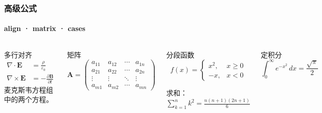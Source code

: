 \begin{frame}
\frametitle{高级公式}
\framesubtitle{align · matrix · cases}

\begin{columns}[T]
\begin{block}{多行对齐}
\begin{align}
  \nabla \cdot \mathbf{E} &= \frac{\rho}{\varepsilon_0} \\
  \nabla \times \mathbf{E} &= -\frac{\partial \mathbf{B}}{\partial t}
\end{align}
麦克斯韦方程组中的两个方程。
\end{block}

\vfill

\begin{exampleblock}{矩阵}
\[
\mathbf{A} = \begin{pmatrix}
a_{11} & a_{12} & \cdots & a_{1n} \\
a_{21} & a_{22} & \cdots & a_{2n} \\
\vdots & \vdots & \ddots & \vdots \\
a_{m1} & a_{m2} & \cdots & a_{mn}
\end{pmatrix}
\]
\end{exampleblock}

\begin{block}{分段函数}
\[
f(x) =
\begin{cases}
x^2, & x \geq 0 \\
-x,  & x < 0
\end{cases}
\]

求和：$\displaystyle\sum_{k=1}^{n} k^2 = \frac{n(n+1)(2n+1)}{6}$
\end{block}

\vfill

\begin{exampleblock}{定积分}
\[
\int_0^\infty e^{-x^2}\,dx = \frac{\sqrt{\pi}}{2}
\]
\end{exampleblock}
\end{columns}
\end{frame}
